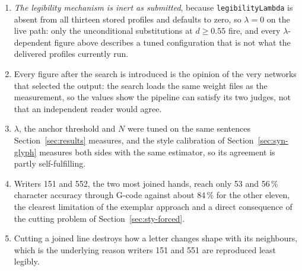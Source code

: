 \begin{enumerate}\setlength{\itemsep}{0pt}\setlength{\parskip}{0pt}
\item \emph{The legibility mechanism is inert as submitted}, because \texttt{legibilityLambda} is absent from all thirteen stored profiles and defaults to zero, so $\lambda=0$ on the live path: only the unconditional substitutions at $d\ge0.55$ fire, and every $\lambda$-dependent figure above describes a tuned configuration that is not what the delivered profiles currently run.
\item Every figure after the search is introduced is the opinion of the very networks that selected the output: the search loads the same weight files as the measurement, so the values show the pipeline can satisfy its two judges, not that an independent reader would agree.
\item $\lambda$, the anchor threshold and $N$ were tuned on the same sentences Section~\ref{sec:results} measures, and the style calibration of Section~\ref{sec:syn-glyph} measures both sides with the same estimator, so its agreement is partly self-fulfilling.
\item Writers 151 and 552, the two most joined hands, reach only 53 and 56\,\% character accuracy through G-code against about 84\,\% for the other eleven, the clearest limitation of the exemplar approach and a direct consequence of the cutting problem of Section~\ref{sec:sty-forced}.
\item Cutting a joined line destroys how a letter changes shape with its neighbours, which is the underlying reason writers 151 and 551 are reproduced least legibly.
\end{enumerate}
